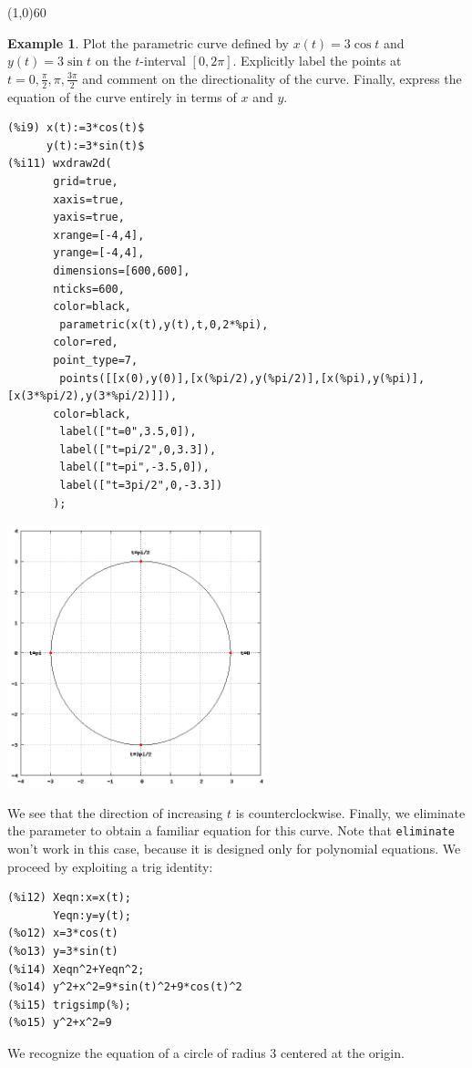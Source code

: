 \documentclass[10.5pt,twoside]{report}
\theoremstyle{definition}
\newtheorem{exmp}{Example}[section]
\begin{document}
\line(1,0){60}
\linethickness{0.5mm}


\begin{exmp} Plot the parametric curve defined by $x(t)=3\cos{t}$ and $y(t)=3\sin{t}$ on the $t$-interval $[0,2\pi]$.  Explicitly label the points at $t=0,\frac{\pi}{2},{\pi}, \frac{3\pi}{2}$ and comment on the directionality of the curve.  Finally, express the equation of the curve entirely in terms of $x$ and $y$.\\


\begin{verbatim}
(%i9) x(t):=3*cos(t)$
      y(t):=3*sin(t)$
(%i11) wxdraw2d(
       grid=true,
       xaxis=true,
       yaxis=true,
       xrange=[-4,4],
       yrange=[-4,4],
       dimensions=[600,600],
       nticks=600,
       color=black,
        parametric(x(t),y(t),t,0,2*%pi),
       color=red,
       point_type=7,
        points([[x(0),y(0)],[x(%pi/2),y(%pi/2)],[x(%pi),y(%pi)],[x(3*%pi/2),y(3*%pi/2)]]),
       color=black,
        label(["t=0",3.5,0]),
        label(["t=pi/2",0,3.3]),
        label(["t=pi",-3.5,0]),
        label(["t=3pi/2",0,-3.3])
       );
\end{verbatim}

\includegraphics[width=3in]{example_5_1_2_1}

We see that the direction of increasing $t$ is counterclockwise.  Finally, we eliminate the parameter to obtain a familiar equation for this curve.  Note that \verb|eliminate| won't work in this case, because it is designed only for polynomial equations.  We proceed by exploiting a trig identity:

\begin{verbatim}
(%i12) Xeqn:x=x(t);
       Yeqn:y=y(t);
(%o12) x=3*cos(t)
(%o13) y=3*sin(t)
(%i14) Xeqn^2+Yeqn^2;
(%o14) y^2+x^2=9*sin(t)^2+9*cos(t)^2
(%i15) trigsimp(%);
(%o15) y^2+x^2=9
\end{verbatim}

We recognize the equation of a circle of radius 3 centered at the origin.

\end{exmp}
\end{document}
